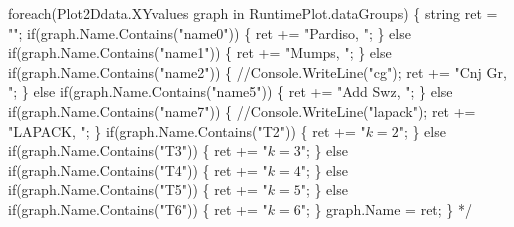 {foreach(Plot2Ddata.XYvalues graph in RuntimePlot.dataGroups) \{\newline 
 \newline 
\btab string ret = "";\newline 
\btab if(graph.Name.Contains("name0")) \{\newline 
\btab \btab ret += "Pardiso, ";\newline 
\btab \} else if(graph.Name.Contains("name1")) \{\newline 
\btab \btab ret += "Mumps, ";\newline 
\btab \} else if(graph.Name.Contains("name2")) \{\newline 
\btab \btab //Console.WriteLine("cg");\newline 
\btab \btab ret += "Cnj Gr, ";\newline 
\btab \} else if(graph.Name.Contains("name5")) \{\newline 
\btab \btab ret += "Add Swz, ";\newline 
\btab \} else if(graph.Name.Contains("name7")) \{\newline 
\btab \btab //Console.WriteLine("lapack");\newline 
\btab \btab ret += "LAPACK, ";\newline 
\btab \} \newline 
\btab if(graph.Name.Contains("T2")) \{\newline 
\btab \btab ret += "$ k = 2 $";\newline 
\btab \} else if(graph.Name.Contains("T3")) \{\newline 
\btab \btab ret += "$ k = 3 $";\newline 
\btab \} else if(graph.Name.Contains("T4")) \{\newline 
\btab \btab ret += "$ k = 4 $";\newline 
\btab \} else if(graph.Name.Contains("T5")) \{\newline 
\btab \btab ret += "$ k = 5 $";\newline 
\btab \} else if(graph.Name.Contains("T6")) \{\newline 
\btab \btab ret += "$ k = 6 $";\newline 
\btab \}\newline 
 \newline 
\btab graph.Name = ret;\newline 
\}\newline 
*/
 }
\BoSSSexe
\BoSSScmd{
 }
\BoSSSexe
\BoSSScmd{
 }
\BoSSSexe
\BoSSScmd{
 }
\BoSSSexe
{}
